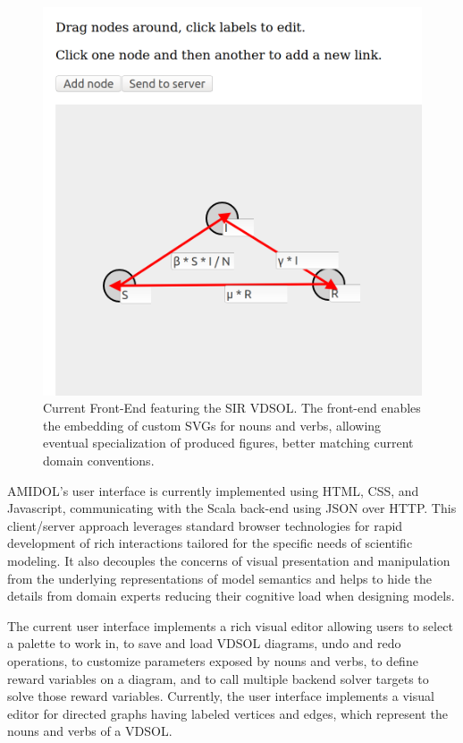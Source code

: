 \documentclass[11pt]{article}
\newcommand{\amidol}{\textsc{AMIDOL}}
\begin{document}
\begin{figure}
\includegraphics[width=\textwidth]{figs/Editor2.png}
\caption{Current Front-End featuring the SIR VDSOL.  The front-end enables the embedding of custom SVGs for nouns and verbs, allowing eventual specialization of produced figures, better matching current domain conventions.}
\label{Fig:Editor}
\end{figure}

\amidol{}'s user interface is currently implemented using HTML, CSS, and Javascript, communicating with the Scala back-end using JSON over HTTP.  This client/server approach leverages standard browser technologies for rapid development of rich interactions tailored for the specific needs of scientific modeling. It also decouples the concerns of visual presentation and manipulation from the underlying representations of model semantics and helps to hide the details from domain experts reducing their cognitive load when designing models.

The current user interface implements a rich visual editor allowing users to select a palette to work in, to save and load VDSOL diagrams, undo and redo operations, to customize parameters exposed by nouns and verbs, to define reward variables on a diagram, and to call multiple backend solver targets to solve those reward variables.
Currently, the user interface implements a visual editor for directed graphs having labeled vertices and edges, which represent the nouns and verbs of a VDSOL.
\end{document}

